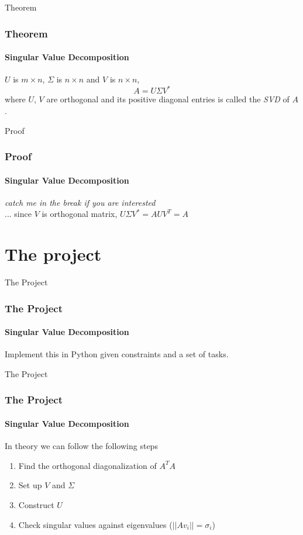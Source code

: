\documentclass{beamer}
\begin{document}

\begin{frame}{Theorem}

\frametitle{Theorem}
\framesubtitle{Singular Value Decomposition}
$U$ is $m\times n$, $\Sigma$ is $n\times n$ and
$V$ is $n\times n$,
\begin{equation}
A = U\Sigma V^*
\end{equation}
where $U$, $V$ are orthogonal and its positive diagonal
entries is called the \emph{SVD} of $A$.

\end{frame}


\begin{frame}{Proof}

\frametitle{Proof}
\framesubtitle{Singular Value Decomposition}
\textit{catch me in the break if you are interested}
\\
... since $V$ is orthogonal matrix, $U\Sigma V^* = AUV^T = A$

\end{frame}

\section{The project}
\begin{frame}{The Project}

\frametitle{The Project}
\framesubtitle{Singular Value Decomposition}

Implement this in Python given constraints and a set of tasks.

\end{frame}


\begin{frame}{The Project}

\frametitle{The Project}
\framesubtitle{Singular Value Decomposition}

In theory we can follow the following steps
\begin{enumerate}
\item Find the orthogonal diagonalization of $A^T A$
\item Set up $V$ and $\Sigma$
\item Construct $U$
\item Check singular values against eigenvalues ($||Av_i|| = \sigma_i $)
\end{enumerate}

\end{frame}
\end{document}
